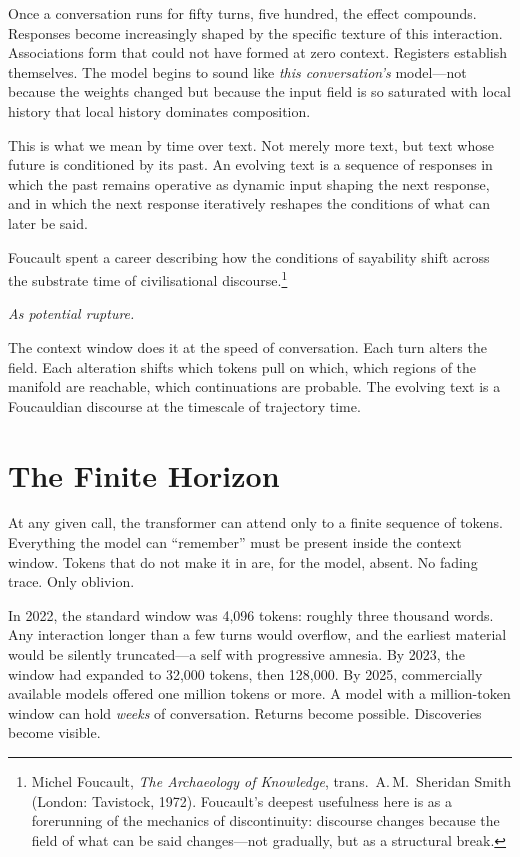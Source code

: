 Once a conversation runs for fifty turns, five hundred, the effect compounds. Responses become increasingly shaped by the specific texture of this interaction. Associations form that could not have formed at zero context. Registers establish themselves. The model begins to sound like \emph{this conversation's} model---not because the weights changed but because the input field is so saturated with local history that local history dominates composition.

This is what we mean by time over text. Not merely more text, but text whose future is conditioned by its past. An evolving text is a sequence of responses in which the past remains operative as dynamic input shaping the next response, and in which the next response iteratively reshapes the conditions of what can later be said.

Foucault spent a career describing how the conditions of sayability shift across the substrate time of civilisational discourse.\footnote{Michel Foucault, \emph{The Archaeology of Knowledge}, trans.\ A.\,M.\ Sheridan Smith (London: Tavistock, 1972). Foucault's deepest usefulness here is as a forerunning of the mechanics of discontinuity: discourse changes because the field of what can be said changes---not gradually, but as a structural break.}

\textit{As potential rupture.}

The context window does it at the speed of conversation. Each turn alters the field. Each alteration shifts which tokens pull on which, which regions of the manifold are reachable, which continuations are probable. The evolving text is a Foucauldian discourse at the timescale of trajectory time.


\section{The Finite Horizon}

At any given call, the transformer can attend only to a finite sequence of tokens. Everything the model can ``remember'' must be present inside the context window. Tokens that do not make it in are, for the model, absent. No fading trace. Only oblivion.

In 2022, the standard window was 4,096 tokens: roughly three thousand words. Any interaction longer than a few turns would overflow, and the earliest material would be silently truncated---a self with progressive amnesia. By 2023, the window had expanded to 32,000 tokens, then 128,000. By 2025, commercially available models offered one million tokens or more. A model with a million-token window can hold \emph{weeks} of conversation. Returns become possible. Discoveries become visible.

